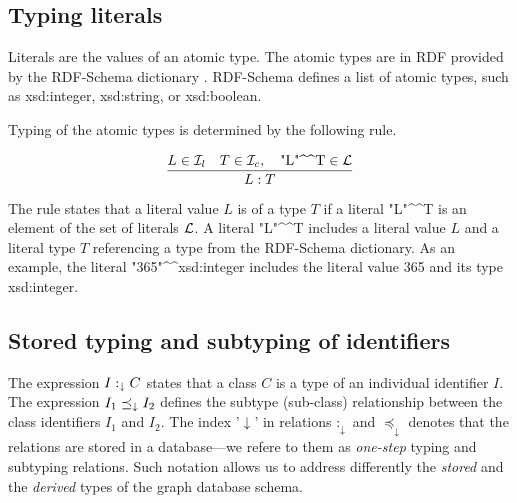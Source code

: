 \documentclass[runningheads]{llncs}
\newcommand{\darr}{\downarrow}
\newcommand{\Lt}{{\cal L}}
\newcommand{\I}{{\cal I}}
\newcommand{\notes}[1]{\noindent\begin{small}-- \emph{#1}\\\end{small}}
\begin{document}







\subsection{Typing literals\label{sec:literals}}

Literals are the values of an atomic type. The atomic types are in RDF
provided by the RDF-Schema dictionary \cite{rdfschema}. RDF-Schema
defines a list of atomic types, such as xsd:integer, xsd:string, or
xsd:boolean.

Typing of the atomic types is determined by the following rule.

\begin{equation}
\dfrac{L\in\I_l\quad T\in\I_c,\quad \text{"L"\textasciicircum\textasciicircum\/T}\in\Lt}
      {L:T}  
\end{equation}

The rule states that a literal value $L$ is of a type $T$ if a literal
"L"\textasciicircum\textasciicircum\/T is an element of the set of
literals $\Lt$. A literal "L"\textasciicircum\textasciicircum\/T
includes a literal value $L$ and a literal type $T$ referencing a type
from the RDF-Schema dictionary. As an example, the literal
"365"\textasciicircum\textasciicircum\/xsd:integer includes the
literal value 365 and its type xsd:integer.





\subsection{Stored typing and subtyping of identifiers\label{sec:idents-stored}}

The expression $I:_\darr\/C$ states that a class $C$ is a type of an
individual identifier $I$. The expression $I_1\preceq_\darr\/I_2$
defines the subtype (sub-class) relationship between the class
identifiers $I_1$ and $I_2$. The index '$\darr$' in relations
$:_\darr$ and $\preceq_\darr$ denotes that the relations are stored in
a database---we refere to them as \emph{one-step} typing and subtyping
relations. Such notation allows us to address differently the
\emph{stored} and the \emph{derived} types of the graph database
schema.
\end{document}
